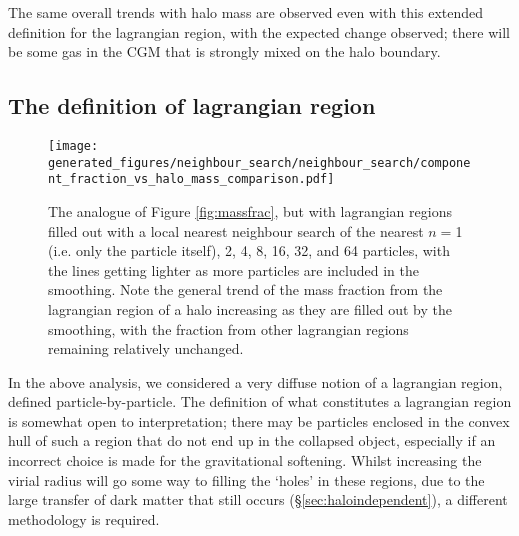 The same overall trends with halo mass are observed even with this extended
definition for the lagrangian region, with the expected change observed; there
will be some gas in the CGM that is strongly mixed on the halo boundary.

\subsection{The definition of lagrangian region}

\begin{figure}
    \centering
    \texttt{[image: generated\_figures/neighbour\_search/neighbour\_search/component\_fraction\_vs\_halo\_mass\_comparison.pdf]}
    \caption{The analogue of Figure \ref{fig:massfrac}, but with lagrangian
    regions filled out with a local nearest neighbour search of the nearest
    $n=$1 (i.e. only the particle itself), 2, 4, 8, 16, 32, and 64 particles,
    with the lines getting lighter as more particles are included in the
    smoothing. Note the general trend of the mass fraction from the
    lagrangian region of a halo increasing as they are filled out by the
    smoothing, with the fraction from other lagrangian regions remaining
    relatively unchanged.}
    \label{fig:filledlrmass}
\end{figure}

In the above analysis, we considered a very diffuse notion of a lagrangian
region, defined particle-by-particle. The definition of what constitutes a
lagrangian region is somewhat open to interpretation; there may be particles
enclosed in the convex hull of such a region that do not end up in the
collapsed object, especially if an incorrect choice is made for the
gravitational softening. Whilst increasing the virial radius will go some way
to filling the `holes' in these regions, due to the large transfer of dark
matter that still occurs (\S \ref{sec:haloindependent}), a different
methodology is required.

